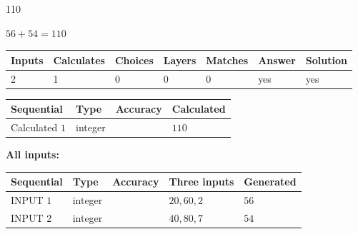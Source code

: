 \documentclass[12pt]{article}
\begin{document}
\noindent{}
 
 

110
 
 
\noindent{}
 
 

 
 
 
\noindent{}
 
 

$ %
56 +  %
54=   %
110$
 
 
\noindent{}
 
 

 
   
   
   
   
\noindent\begin{tabular}{|l|l|l|l|l|l|l|}
 \hline
Inputs & Calculates & Choices & Layers & Matches & Answer & Solution \\ \hline
 2  & 
 1  & 
 0
  & 
 0  & 
 0  & 
  yes & 
  yes 
  \\ \hline
 \end{tabular}
   
   
   
   
\noindent{}
   
   
  
  
\noindent\begin{tabular}{|l|l|l|l|}
\hline
 Sequential & Type & Accuracy & Calculated \\ 
\hline
 
 
  Calculated $  1 $ & integer &  & 
  $ 110 $ 
 \\  \hline  
 \end{tabular}
   
   
   
   
\noindent\vspace{0.1in}\hspace{-0.08in} {\textbf{\Large{All inputs: }}}
   
   
  
  
\noindent\begin{tabular}{|l|l|l|l|l|}
\hline
 Sequential & Type & Accuracy & Three inputs & Generated \\ 
\hline
 
 
  INPUT $  1 $ & integer &  & $
 20
 , 
 60
 , 
 2
 $ & $ 56 $ 
 \\  \hline  
 
 
  INPUT $  2 $ & integer &  & $
 40
 , 
 80
 , 
 7
 $ & $ 54 $ 
 \\  \hline  
 \end{tabular}
   
\end{document}
